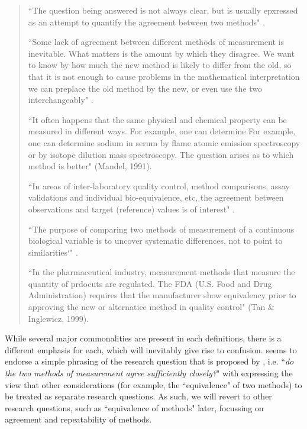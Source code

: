 \documentclass[12pt, a4paper]{report}
\theoremstyle{plain}
\theoremstyle{definition}
\theoremstyle{remark}
\begin{document}
	\begin{quote}
		``The question being answered is not always clear, but is usually epxressed as an attempt to quantify the agreement
		between two methods" \citep{BA95}.
		
		``Some lack of agreement between different methods of measurement is inevitable. What matters is the amount by which they disagree. We want to know by how much the new method is likely to differ from the old, so that it is not enough to cause problems in the mathematical interpretation we can preplace the old method by the new, or even use the two interchangeably" \citep{BA99}.
		
		
		``It often happens that the same physical and chemical property can be measured in different ways. For example, one can determine For example, one can determine sodium in serum by flame atomic emission spectroscopy or by isotope dilution mass spectroscopy. The question arises as to which method is better" (Mandel, 1991).
		
		``In areas of inter-laboratory quality control, method comparisons, assay validations and individual bio-equivalence, etc, the agreement between observations and target (reference) values is
		of interest" \citep{lin2002}.
		
		``The purpose of comparing two methods of measurement of a continuous biological variable is to uncover systematic differences, not to point to
		similarities`" \citep{ludbrook97}.
		
		``In the pharmaceutical industry, measurement methods that measure the quantity of prdocuts are regulated. The FDA (U.S. Food and Drug Administration) requires that the manufacturer show equivalency prior to approving the new or alternatice method in quality control" (Tan \& Inglewicz, 1999). 
	\end{quote}
	
	While several major commonalities are present in each definitions, there is a different emphasis for each, which will inevitably give rise to confusion. \citet{BXC2010} seems to endorse a simple phrasing of the research question that is proposed by \citet{BA83}, i.e. ``\textit{do the two methods of measurement agree sufficiently closely?}" with \citet{BXC2010} expressing the view that other considerations (for example, the ``equivalence" of two methods) to be treated as separate research questions. As such, we will revert to other research questions, such as ``equivalence of methods" later, focussing on agreement and repeatability of methods.
\end{document}
